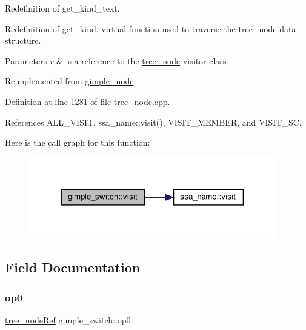 Redefinition of get\+\_\+kind\+\_\+text. 

Redefinition of get\+\_\+kind. virtual function used to traverse the \hyperlink{classtree__node}{tree\+\_\+node} data structure. 
\begin{DoxyParams}{Parameters}
{\em v} & is a reference to the \hyperlink{classtree__node}{tree\+\_\+node} visitor class \\
\hline
\end{DoxyParams}


Reimplemented from \hyperlink{structgimple__node_a337b029a3aca9c1b96311b6e6668f7f3}{gimple\+\_\+node}.



Definition at line 1281 of file tree\+\_\+node.\+cpp.



References A\+L\+L\+\_\+\+V\+I\+S\+IT, ssa\+\_\+name\+::visit(), V\+I\+S\+I\+T\+\_\+\+M\+E\+M\+B\+ER, and V\+I\+S\+I\+T\+\_\+\+SC.

Here is the call graph for this function\+:
\nopagebreak
\begin{figure}[H]
\begin{center}
\leavevmode
\includegraphics[width=305pt]{dd/d91/structgimple__switch_a2fc71fef3c7d9d08e116ca7dba93d0e2_cgraph}
\end{center}
\end{figure}


\subsection{Field Documentation}
\mbox{\label{structgimple__switch_a6f8278355156c84217fe69a0a639bfbb}} 
\subsubsection{\texorpdfstring{op0}{op0}}
{\footnotesize\ttfamily \hyperlink{tree__node_8hpp_a6ee377554d1c4871ad66a337eaa67fd5}{tree\+\_\+node\+Ref} gimple\+\_\+switch\+::op0}



